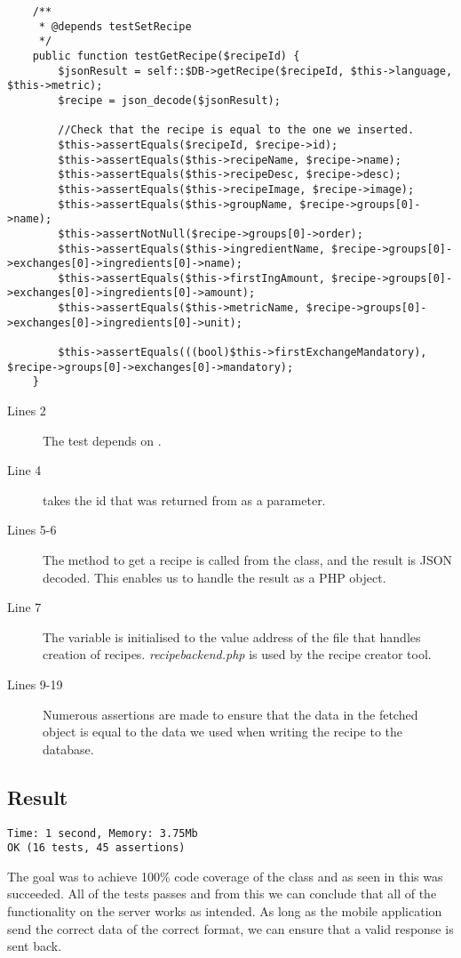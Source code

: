 \begin{lstlisting}
    /**
     * @depends testSetRecipe
     */
    public function testGetRecipe($recipeId) {
        $jsonResult = self::$DB->getRecipe($recipeId, $this->language, $this->metric);
        $recipe = json_decode($jsonResult);

        //Check that the recipe is equal to the one we inserted.
        $this->assertEquals($recipeId, $recipe->id);
        $this->assertEquals($this->recipeName, $recipe->name);
        $this->assertEquals($this->recipeDesc, $recipe->desc);
        $this->assertEquals($this->recipeImage, $recipe->image);
        $this->assertEquals($this->groupName, $recipe->groups[0]->name);
        $this->assertNotNull($recipe->groups[0]->order);
        $this->assertEquals($this->ingredientName, $recipe->groups[0]->exchanges[0]->ingredients[0]->name);
        $this->assertEquals($this->firstIngAmount, $recipe->groups[0]->exchanges[0]->ingredients[0]->amount);
        $this->assertEquals($this->metricName, $recipe->groups[0]->exchanges[0]->ingredients[0]->unit);

        $this->assertEquals(((bool)$this->firstExchangeMandatory), $recipe->groups[0]->exchanges[0]->mandatory);
    }
\end{lstlisting}%

\begin{description}
\item[Lines 2] The test depends on .
\item[Line 4]  takes the id that was returned from  as a parameter.
\item[Lines 5-6] The method to get a recipe is called from the  class, and the result is JSON decoded. This enables us to handle the result as a PHP object.
\item[Line 7] The  variable is initialised to the value address of the file that handles creation of recipes. \textit{recipebackend.php} is used by the recipe creator tool.%
\item[Lines 9-19] Numerous assertions are made to ensure that the data in the fetched object is equal to the data we used when writing the recipe to the database.
\end{description}

\subsection*{Result}
\begin{lstlisting}[numbers=none, basicstyle=\ttfamily, caption={The result of the PHPUnit test}]
Time: 1 second, Memory: 3.75Mb
OK (16 tests, 45 assertions)
\end{lstlisting}
The goal was to achieve 100\% code coverage of the  class and as seen in  this was succeeded. All of the tests passes and from this we can conclude that all of the functionality on the server works as intended. As long as the mobile application send the correct data of the correct format, we can ensure that a valid response is sent back.

